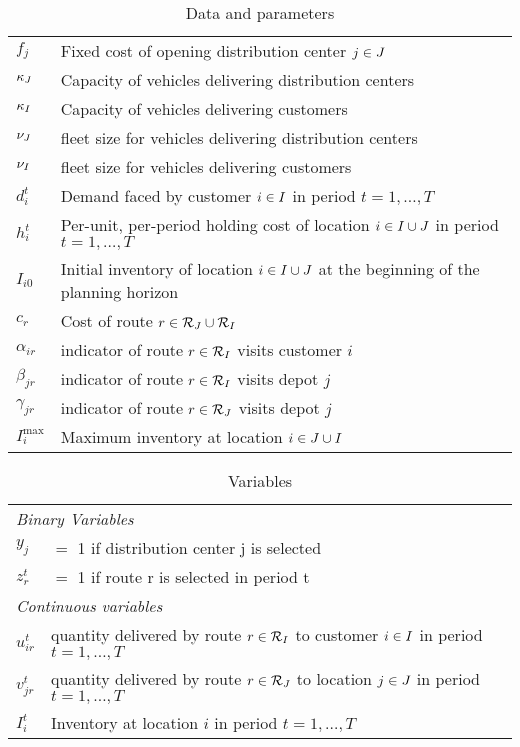 \documentclass[a4paper,10pt]{article}
\begin{document}
\begin{linenumbers}
\begin{table} 
	\centering
	\begin{tabular}{ll}
		\toprule
         $f_j$ & Fixed cost of opening distribution center $j\in J$\\ 
        $\kappa_{J}$ & Capacity of vehicles delivering distribution centers\\ 
        $\kappa_{I}$ & Capacity of vehicles delivering customers\\ 
        $\nu_{J}$ & fleet size for vehicles delivering distribution centers\\ 
        $\nu_{I}$ & fleet size for vehicles delivering customers\\ 
        $d^t_i$ & Demand faced by customer $i\in I$ in period $t=1,\ldots,T$\\
        $h^t_i$ & Per-unit, per-period holding cost of location $i\in I\cup J$ in period $t=1,\ldots, T$\\
        $I_{i0}$ & Initial inventory of location $i\in I\cup J$ at the beginning of the planning horizon\\
        $c_r$ & Cost of route $r\in \mathcal{R}_J\cup\mathcal{R}_I$\\
        $\alpha_{ir}$ & indicator of route $r\in\mathcal{R}_I$ visits customer $i$\\
        $\beta_{jr}$ & indicator of route $r\in\mathcal{R}_I$ visits depot $j$\\
        $\gamma_{jr}$ & indicator of route $r\in\mathcal{R}_J$ visits depot $j$\\
        $I_i^{\max}$ & Maximum inventory at location $i\in J\cup I$\\
         \bottomrule
     \end{tabular}
\caption{Data and parameters}
\label{tab:data}
\end{table}

\begin{table} 
\centering
\begin{tabular}{ll}
	\toprule       
    \multicolumn{2}{l}{\textit{Binary Variables}}\\
    $y_j$ & $=$ 1 if distribution center j is selected \\
    $z^t_r$ & $=$ 1 if route r is selected in period t\\
    \midrule
    \multicolumn{2}{l}{\textit{Continuous variables}}\\
    $u^t_{ir}$ &  quantity delivered by route $r\in\mathcal{R}_I$ to customer $i\in I$ in period $t=1,\ldots,T$\\
    $v^t_{jr}$ &  quantity delivered by route $r\in\mathcal{R}_J$ to location $j\in J$ in period $t=1,\ldots,T$\\
    $I^t_i$ &  Inventory at location $i$ in period $t=1,\ldots,T$\\
    \bottomrule
   \end{tabular}
\caption{Variables}
\label{tab:var}
\end{table}


\end{linenumbers}
\end{document}
